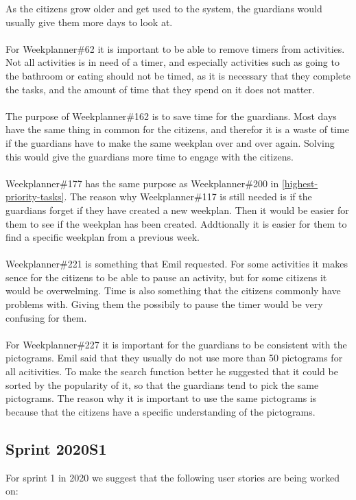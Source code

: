 As the citizens grow older and get used to the system, the guardians would usually give them more days to look at.
\\\\
For Weekplanner\#62 it is important to be able to remove timers from activities. 
Not all activities is in need of a timer, and especially activities such as going to the bathroom or eating should not be timed, as it is necessary that they complete the tasks, and the amount of time that they spend on it does not matter.
\\\\
The purpose of Weekplanner\#162 is to save time for the guardians. 
Most days have the same thing in common for the citizens, and therefor it is a waste of time if the guardians have to make the same weekplan over and over again.
Solving this would give the guardians more time to engage with the citizens.
\\\\
Weekplanner\#177 has the same purpose as Weekplanner\#200 in \autoref{highest-priority-tasks}. 
The reason why Weekplanner\#117 is still needed is if the guardians forget if they have created a new weekplan.
Then it would be easier for them to see if the weekplan has been created.
Addtionally it is easier for them to find a specific weekplan from a previous week.
\\\\
Weekplanner\#221 is something that Emil requested. 
For some activities it makes sence for the citizens to be able to pause an activity, but for some citizens it would be overwelming.
Time is also something that the citizens commonly have problems with. 
Giving them the possibily to pause the timer would be very confusing for them.
\\\\
For Weekplanner\#227 it is important for the guardians to be consistent with the pictograms.
Emil said that they usually do not use more than 50 pictograms for all acitivities. 
To make the search function better he suggested that it could be sorted by the popularity of it, so that the guardians tend to pick the same pictograms.
The reason why it is important to use the same pictograms is because that the citizens have a specific understanding of the pictograms.

\subsection{Sprint 2020S1}
For sprint 1 in 2020 we suggest that the following user stories are being worked on:

